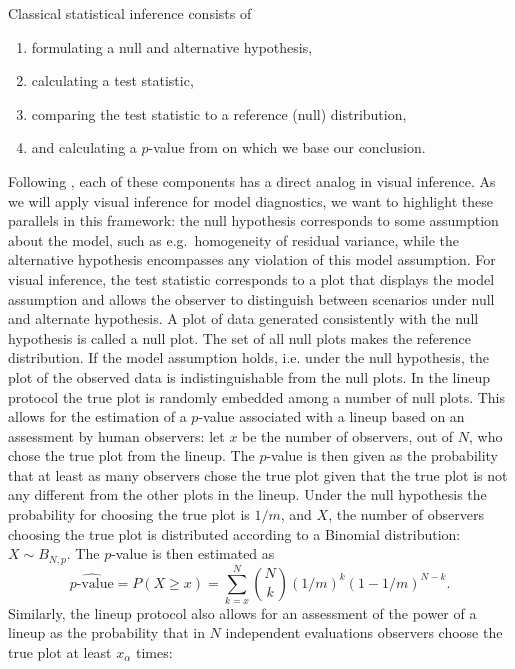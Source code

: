 \documentclass{article} %
\newcommand{\hh}[1]{{\color{orange} #1}}
\begin{document}
Classical statistical inference consists of 
\begin{enumerate}
	\item formulating a null and alternative hypothesis,
	\item calculating a test statistic,
	\item comparing the test statistic to a reference (null) distribution,
	\item and calculating a $p$-value from on which we base our conclusion.
\end{enumerate}
Following \citeauthor{Buja:2009hp}, each of these components has a direct analog in visual inference. \hh{As we will apply visual inference for model diagnostics, we want to highlight these parallels in this framework: the null  hypothesis corresponds to some assumption about the model, such as e.g.~homogeneity of residual variance,
while
the alternative hypothesis encompasses any violation of this model assumption. For visual inference, the test statistic corresponds to a plot  that displays the model assumption and allows the observer to distinguish between scenarios under null and alternate hypothesis. 
A plot of data generated consistently with the null hypothesis is called a null plot. The set of all null plots makes the reference distribution. 
If the model assumption holds, i.e.  under the null hypothesis, the plot of the observed data is indistinguishable from the null plots. 
In the lineup protocol the true plot is randomly embedded among a number of null plots. 
This allows for the estimation of a $p$-value associated with a lineup
based on an assessment  by human observers: let $x$ be the number of observers, out of $N$, who chose the true plot from the lineup. The $p$-value is then given as the probability that at least as many observers chose the true plot given that the true plot is not any different from the other plots in the lineup. Under the null hypothesis the probability for choosing the true plot is $1/m$, and $X$, the number of observers choosing the true plot is distributed according to a Binomial distribution: $X \sim B_{N, p}$. The $p$-value is then estimated as
\begin{equation}\label{eqn.pvalue}
\widehat{p\text{-value}} = P(X \ge x) = \sum_{k= x}^N {N \choose k} \left(1/m\right)^k \left(1 - 1/m\right)^{N-k}.
\end{equation}
Similarly, the lineup protocol also allows for an assessment of the power of a lineup \cite{mahbub:2013} as the probability that in $N$ independent evaluations observers choose the true plot at least $x_\alpha$ times:
}
\end{document}

